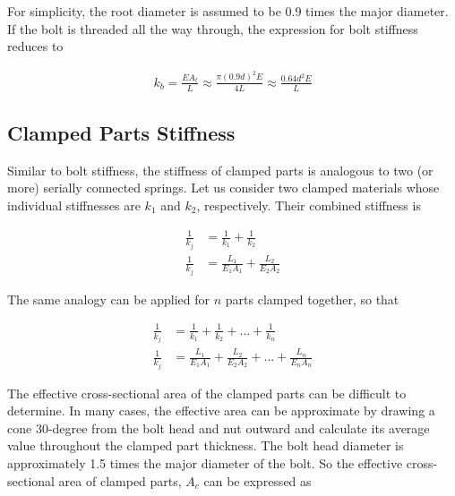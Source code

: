 \documentclass[
10pt,
a4paper,
openany,
svgnames,
]{book}
\begin{document}
For simplicity, the root diameter is assumed to be 0.9 times the major diameter. If the bolt is threaded all the way through, the expression for bolt stiffness reduces to

\begin{align}
  k_b = \frac{EA_t}{L} \approx \frac{\pi (0.9d)^2 E}{4L} \approx \frac{0.64d^2E}{L}  \label{eqn: bolt stiffness}
\end{align}

\subsection{Clamped Parts Stiffness}

Similar to bolt stiffness, the stiffness of clamped parts is analogous to two (or more) serially connected springs. Let us consider two clamped materials whose individual stiffnesses are $k_1$ and $k_2$, respectively. Their combined stiffness is

\begin{align}
  \frac{1}{k_j} &= \frac{1}{k_1} + \frac{1}{k_2} \nonumber \\ 
  \frac{1}{k_j} &= \frac{L_1}{E_1A_1} + \frac{L_2}{E_2A_2}
\end{align}

The same analogy can be applied for $n$ parts clamped together, so that

\begin{align}
  \frac{1}{k_j} &= \frac{1}{k_1} + \frac{1}{k_2} + ... + \frac{1}{k_n} \nonumber \\ 
  \frac{1}{k_j} &= \frac{L_1}{E_1A_1} + \frac{L_2}{E_2A_2}+ ... + \frac{L_n}{E_nA_n} 
\end{align}

The effective cross-sectional area of the clamped parts can be difficult to determine. In many cases, the effective area can be approximate by drawing a cone 30-degree from the bolt head and nut outward and calculate its average value throughout the clamped part thickness. The bolt head diameter is approximately 1.5 times the major diameter of the bolt. So the effective cross-sectional area of clamped parts, $A_c$ can be expressed as
\end{document}
